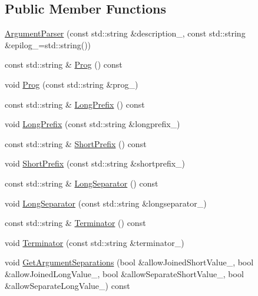 \subsection*{Public Member Functions}
\begin{DoxyCompactItemize}
\item 
\hyperlink{classargs_1_1_argument_parser_a48265b3dc87a042e7c02846dd451b06e}{Argument\+Parser} (const std\+::string \&description\+\_\+, const std\+::string \&epilog\+\_\+=std\+::string())
\item 
const std\+::string \& \hyperlink{classargs_1_1_argument_parser_ac085920cbb59e059fd57233990525707}{Prog} () const
\item 
void \hyperlink{classargs_1_1_argument_parser_a33356eb1ebe72f6f59829237027b17fa}{Prog} (const std\+::string \&prog\+\_\+)
\item 
const std\+::string \& \hyperlink{classargs_1_1_argument_parser_a35f97d0a1219e2a01e10a697b7a24d21}{Long\+Prefix} () const
\item 
void \hyperlink{classargs_1_1_argument_parser_a6a03dcc56b439d54b85e704be5d2f9d5}{Long\+Prefix} (const std\+::string \&longprefix\+\_\+)
\item 
const std\+::string \& \hyperlink{classargs_1_1_argument_parser_afe9cefef0ea866a39fd33815f0f08f92}{Short\+Prefix} () const
\item 
void \hyperlink{classargs_1_1_argument_parser_ad26c7ce7f17994dd0cc81e8137c1e5a8}{Short\+Prefix} (const std\+::string \&shortprefix\+\_\+)
\item 
const std\+::string \& \hyperlink{classargs_1_1_argument_parser_a7bb74e0a1bcac7f390f5bf5a5fef44e6}{Long\+Separator} () const
\item 
void \hyperlink{classargs_1_1_argument_parser_a748cd901c687da9110b52eae1bc1ff74}{Long\+Separator} (const std\+::string \&longseparator\+\_\+)
\item 
const std\+::string \& \hyperlink{classargs_1_1_argument_parser_ae864b7e947bba6c168780b82ebacdb5e}{Terminator} () const
\item 
void \hyperlink{classargs_1_1_argument_parser_aac85423bb4103a71893bc0e0247c1acd}{Terminator} (const std\+::string \&terminator\+\_\+)
\item 
void \hyperlink{classargs_1_1_argument_parser_aba2c63676eeb73db2ea857a03e421513}{Get\+Argument\+Separations} (bool \&allow\+Joined\+Short\+Value\+\_\+, bool \&allow\+Joined\+Long\+Value\+\_\+, bool \&allow\+Separate\+Short\+Value\+\_\+, bool \&allow\+Separate\+Long\+Value\+\_\+) const
\item 

\end{DoxyCompactItemize}
